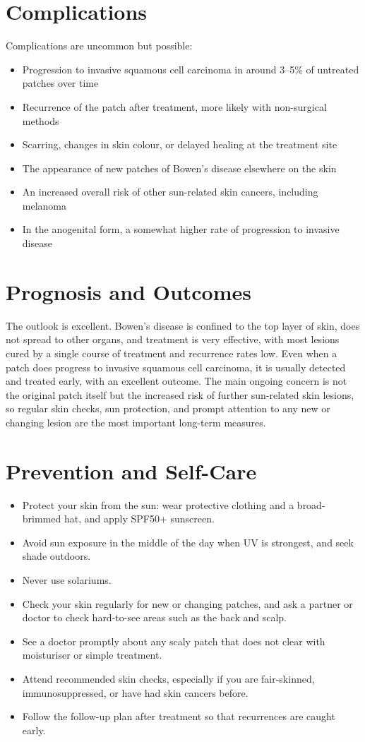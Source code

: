 \section*{Complications}
Complications are uncommon but possible:
\begin{itemize}
    \item Progression to invasive squamous cell carcinoma in around 3--5\% of untreated patches over time
    \item Recurrence of the patch after treatment, more likely with non-surgical methods
    \item Scarring, changes in skin colour, or delayed healing at the treatment site
    \item The appearance of new patches of Bowen's disease elsewhere on the skin
    \item An increased overall risk of other sun-related skin cancers, including melanoma
    \item In the anogenital form, a somewhat higher rate of progression to invasive disease
\end{itemize}

\section*{Prognosis and Outcomes}
The outlook is excellent. Bowen's disease is confined to the top layer of skin, does not spread to other organs, and treatment is very effective, with most lesions cured by a single course of treatment and recurrence rates low. Even when a patch does progress to invasive squamous cell carcinoma, it is usually detected and treated early, with an excellent outcome. The main ongoing concern is not the original patch itself but the increased risk of further sun-related skin lesions, so regular skin checks, sun protection, and prompt attention to any new or changing lesion are the most important long-term measures.

\section*{Prevention and Self-Care}
\begin{itemize}
    \item Protect your skin from the sun: wear protective clothing and a broad-brimmed hat, and apply SPF50+ sunscreen.
    \item Avoid sun exposure in the middle of the day when UV is strongest, and seek shade outdoors.
    \item Never use solariums.
    \item Check your skin regularly for new or changing patches, and ask a partner or doctor to check hard-to-see areas such as the back and scalp.
    \item See a doctor promptly about any scaly patch that does not clear with moisturiser or simple treatment.
    \item Attend recommended skin checks, especially if you are fair-skinned, immunosuppressed, or have had skin cancers before.
    \item Follow the follow-up plan after treatment so that recurrences are caught early.
\end{itemize}

